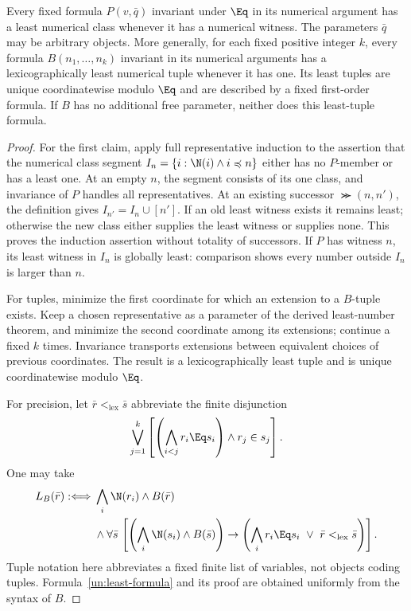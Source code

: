 \begin{lemma}\label{un:least}
Every fixed formula $P(v,\bar q)$ invariant under $\Eq$ in its numerical
argument has a least numerical class whenever it has a numerical
witness. The parameters $\bar q$ may be arbitrary objects.
More generally, for each fixed positive integer $k$, every formula
$B(n_1,\ldots,n_k)$ invariant in its numerical arguments has a
lexicographically least numerical tuple whenever it has one. Its least
tuples are unique coordinatewise modulo $\Eq$ and are described by a
fixed first-order formula. If $B$ has no additional free parameter,
neither does this least-tuple formula.
\end{lemma}
\begin{proof}
For the first claim, apply full representative induction to the assertion
that the numerical class segment
$I_n=\{i:\N(i)\land i\preccurlyeq n\}$ either has no $P$-member or
has a least one. At an empty $n$, the segment consists of its one class,
and invariance of $P$ handles all representatives. At an existing
successor $\Succ(n,n')$, the definition gives
$I_{n'}=I_n\cup[n']$. If an old least witness exists it remains least;
otherwise the new class either supplies the least witness or supplies
none. This proves the induction assertion without totality of successors.
If $P$ has witness $n$, its least witness in $I_n$ is globally least:
comparison shows every number outside $I_n$ is larger than $n$.

For tuples, minimize the first coordinate for which an extension to a
$B$-tuple exists. Keep a chosen representative as a parameter of the
derived least-number theorem, and minimize the second coordinate among
its extensions; continue a fixed $k$ times. Invariance transports
extensions between equivalent choices of previous coordinates. The
result is a lexicographically least tuple and is unique coordinatewise
modulo $\Eq$.

For precision, let $\bar r<_{\mathrm{lex}}\bar s$ abbreviate the finite
disjunction
\[
 \bigvee_{j=1}^{k}
       \left[\left(\bigwedge_{i<j}r_i\Eq s_i\right)\land r_j\in s_j\right].
\]
One may take
\begin{equation}\label{un:least-formula}
\begin{split}
 L_B(\bar r):\Longleftrightarrow{}&
 \bigwedge_i\N(r_i)\land B(\bar r)\\
 &\land\forall\bar s\,
 \left[\left(\bigwedge_i\N(s_i)\land B(\bar s)\right)\to
   \left(\bigwedge_i r_i\Eq s_i\ \lor\
                             \bar r<_{\mathrm{lex}}\bar s\right)\right].
\end{split}
\end{equation}
Tuple notation here abbreviates a fixed finite list of variables, not
objects coding tuples. Formula~\eqref{un:least-formula} and its proof
are obtained uniformly from the syntax of $B$.
\end{proof}

